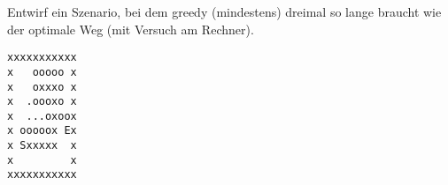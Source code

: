 \question[2]
Entwirf ein Szenario, bei dem greedy (mindestens) dreimal so lange braucht
wie der optimale Weg (mit Versuch am Rechner).
\begin{solutionbox}{4cm}
\begin{lstlisting}
xxxxxxxxxxx
x   ooooo x
x   oxxxo x
x  .oooxo x
x  ...oxoox
x ooooox Ex
x Sxxxxx  x
x         x
xxxxxxxxxxx
\end{lstlisting}
\end{solutionbox}
